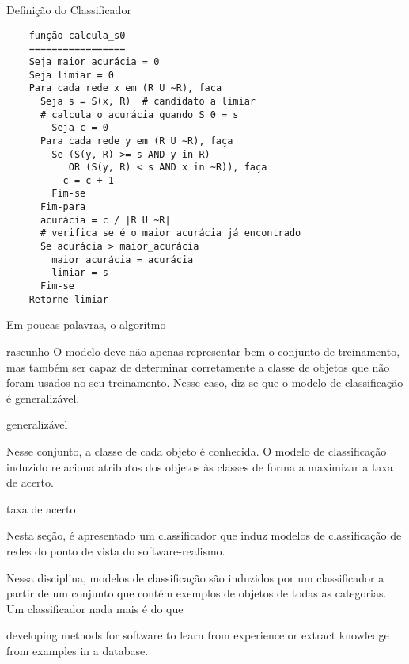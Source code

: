 \begin{section}{Definição do Classificador}
	\begin{verbatim}
	função calcula_s0
	=================
	Seja maior_acurácia = 0
	Seja limiar = 0
	Para cada rede x em (R U ~R), faça
	  Seja s = S(x, R)  # candidato a limiar
	  # calcula o acurácia quando S_0 = s
		Seja c = 0
	  Para cada rede y em (R U ~R), faça
	    Se (S(y, R) >= s AND y in R)
	       OR (S(y, R) < s AND x in ~R)), faça
	      c = c + 1
	    Fim-se
	  Fim-para
	  acurácia = c / |R U ~R|
	  # verifica se é o maior acurácia já encontrado
	  Se acurácia > maior_acurácia
	    maior_acurácia = acurácia
	    limiar = s
	  Fim-se
	Retorne limiar
	\end{verbatim}
	 
Em poucas palavras, o algoritmo 

\end{section}

\begin{section}{rascunho}
		O modelo deve não apenas representar bem o conjunto de treinamento, mas também ser capaz de determinar corretamente a classe de objetos que não foram usados no seu treinamento. Nesse caso, diz-se que o modelo de classificação é generalizável.
		
		
		
		generalizável
		
		Nesse conjunto, a classe de cada objeto é conhecida. O modelo de classificação induzido relaciona atributos dos objetos às classes de forma a maximizar a taxa de acerto.
		
		
		
		taxa de acerto
		
		Nesta seção, é apresentado um classificador que induz modelos de classificação de redes do ponto de vista do software-realismo.
		
		Nessa disciplina, modelos de classificação são induzidos por um classificador a partir de um conjunto que contém exemplos de objetos de todas as categorias. Um classificador nada mais é do que 
		
		
		developing methods for software to learn from experience or extract knowledge from examples in a database.
		
		
	
\end{section}
